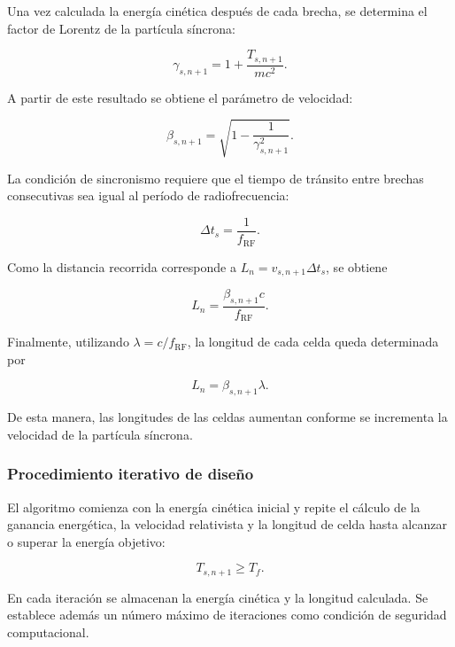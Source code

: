 Una vez calculada la energía cinética después de cada brecha, se determina el factor de Lorentz de la partícula síncrona:

\begin{equation}
    \gamma_{s,n+1}
    =
    1+\frac{T_{s,n+1}}{mc^2}.
\end{equation}

A partir de este resultado se obtiene el parámetro de velocidad:

\begin{equation}
    \beta_{s,n+1}
    =
    \sqrt{1-\frac{1}{\gamma_{s,n+1}^{2}}}.
\end{equation}

La condición de sincronismo requiere que el tiempo de tránsito entre brechas consecutivas sea igual al período de radiofrecuencia:

\begin{equation}
    \Delta t_s=\frac{1}{f_{\mathrm{RF}}}.
\end{equation}

Como la distancia recorrida corresponde a $L_n=v_{s,n+1}\Delta t_s$, se obtiene

\begin{equation}
    L_n=\frac{\beta_{s,n+1}c}{f_{\mathrm{RF}}}.
\end{equation}

Finalmente, utilizando $\lambda=c/f_{\mathrm{RF}}$, la longitud de cada celda queda determinada por

\begin{equation}
    \boxed{
    L_n=\beta_{s,n+1}\lambda
    }.
\end{equation}

De esta manera, las longitudes de las celdas aumentan conforme se incrementa la velocidad de la partícula síncrona.

\subsubsection*{Procedimiento iterativo de diseño}

El algoritmo comienza con la energía cinética inicial y repite el cálculo de la ganancia energética, la velocidad relativista y la longitud de celda hasta alcanzar o superar la energía objetivo:

\begin{equation}
    T_{s,n+1}\geq T_f.
\end{equation}

En cada iteración se almacenan la energía cinética y la longitud calculada. Se establece además un número máximo de iteraciones como condición de seguridad computacional.

